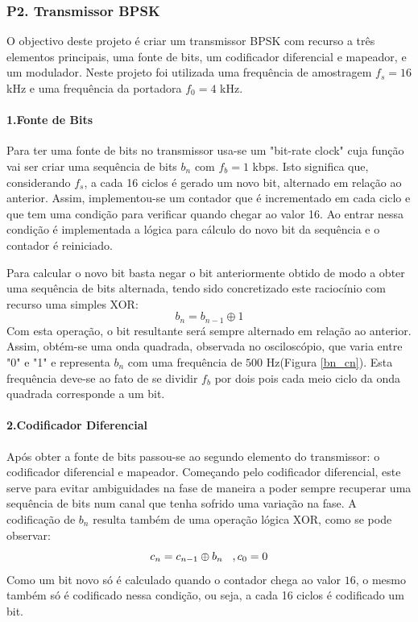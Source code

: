 \documentclass[11pt]{article}
\numberwithin{equation}{section}
\begin{document}
\subsubsection{P2. Transmissor BPSK}

O objectivo deste projeto é criar um transmissor BPSK com recurso a três elementos principais, uma fonte de bits, um codificador diferencial e mapeador, e um modulador.
Neste projeto foi utilizada uma frequência de amostragem $f_s=16$ kHz e uma frequência da portadora $f_0=4$ kHz.

\paragraph{1.Fonte de Bits} \hspace{0pt}

Para ter uma fonte de bits no transmissor usa-se um "bit-rate clock" cuja função vai ser criar uma sequência de bits $ b_n $ com $f_b=1$ kbps. Isto significa que, considerando $f_s$, a cada 16 ciclos é gerado um novo bit, alternado em relação ao anterior. Assim, implementou-se um contador que é incrementado em cada ciclo  e que tem uma condição para verificar quando chegar ao valor 16. Ao entrar nessa condição é implementada a lógica para cálculo do novo bit da sequência e o contador é reiniciado.

Para calcular o novo bit basta negar o bit anteriormente obtido de modo a obter uma sequência de bits alternada, tendo sido concretizado este raciocínio com recurso uma simples XOR:
\begin{equation}
b_n=b_{n-1} \oplus 1
\end{equation}
Com esta operação, o bit resultante será sempre alternado em relação ao anterior.
Assim, obtém-se uma onda quadrada, observada no osciloscópio, que varia entre "0" e "1" e representa $ b_n $  com uma frequência de $500$ Hz(Figura \ref{bn_cn}). Esta frequência deve-se ao fato de se dividir  $f_b$ por dois pois cada meio ciclo da onda quadrada corresponde a um bit.  

\paragraph{2.Codificador Diferencial} \hspace{0pt}

Após obter a fonte de bits passou-se ao segundo elemento do transmissor: o codificador diferencial e mapeador. Começando pelo codificador diferencial, este serve para evitar ambiguidades na fase de maneira a poder sempre recuperar uma sequência de bits num canal que tenha sofrido uma variação na fase.
A codificação de $b_n$ resulta também de uma operação lógica XOR, como se pode observar: 
\begin{equation}
c_n=c_{n-1} \oplus b_n \hspace{3 mm} ,c_0=0
\end{equation}
Como um bit novo só é calculado quando o contador chega ao valor $16$, o mesmo também só é codificado nessa condição, ou seja, a cada 16 ciclos é codificado um bit. 
\end{document}

